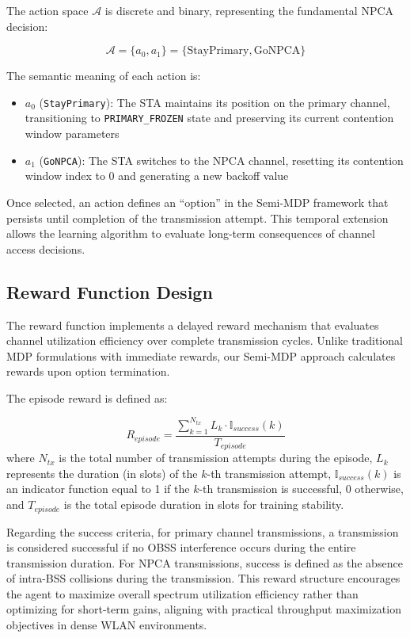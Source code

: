 \documentclass[conference]{IEEEtran}
\begin{document}
The action space $\mathcal{A}$ is discrete and binary, representing the fundamental NPCA decision:

\begin{equation}
\mathcal{A} = \{a_0, a_1\} = \{\text{StayPrimary}, \text{GoNPCA}\}
\label{eq:action_space}
\end{equation}

The semantic meaning of each action is:

\begin{itemize}
\item $a_0$ (\texttt{StayPrimary}): The STA maintains its position on the primary channel, transitioning to \texttt{PRIMARY\_FROZEN} state and preserving its current contention window parameters
\item $a_1$ (\texttt{GoNPCA}): The STA switches to the NPCA channel, resetting its contention window index to 0 and generating a new backoff value
\end{itemize}

Once selected, an action defines an ``option'' in the Semi-MDP framework that persists until completion of the transmission attempt. This temporal extension allows the learning algorithm to evaluate long-term consequences of channel access decisions.

\subsection{Reward Function Design}

The reward function implements a delayed reward mechanism that evaluates channel utilization efficiency over complete transmission cycles. Unlike traditional MDP formulations with immediate rewards, our Semi-MDP approach calculates rewards upon option termination.

The episode reward is defined as:

\begin{equation}
R_{episode} = \frac{\sum_{k=1}^{N_{tx}} L_k \cdot \mathbb{I}_{success}(k)}{T_{episode}}
\label{eq:reward_function}
\end{equation}
where $N_{tx}$ is the total number of transmission attempts during the episode, $L_k$ represents the duration (in slots) of the $k$-th transmission attempt, $\mathbb{I}_{success}(k)$ is an indicator function equal to 1 if the $k$-th transmission is successful, 0 otherwise, and $T_{episode}$ is the total episode duration in slots for training stability.

Regarding the success criteria, for primary channel transmissions, a transmission is considered successful if no OBSS interference occurs during the entire transmission duration. For NPCA transmissions, success is defined as the absence of intra-BSS collisions during the transmission. This reward structure encourages the agent to maximize overall spectrum utilization efficiency rather than optimizing for short-term gains, aligning with practical throughput maximization objectives in dense WLAN environments.
\end{document}
